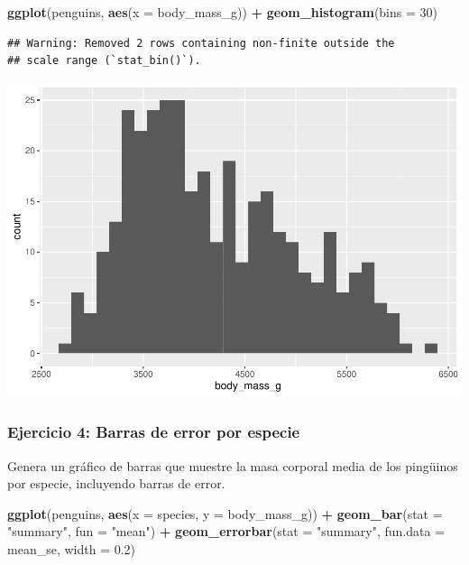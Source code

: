 \documentclass[
]{book}
\newenvironment{Shaded}{\begin{snugshade}}{\end{snugshade}}
\newcommand{\AttributeTok}[1]{\textcolor[rgb]{0.13,0.29,0.53}{#1}}
\newcommand{\DecValTok}[1]{\textcolor[rgb]{0.00,0.00,0.81}{#1}}
\newcommand{\FloatTok}[1]{\textcolor[rgb]{0.00,0.00,0.81}{#1}}
\newcommand{\FunctionTok}[1]{\textcolor[rgb]{0.13,0.29,0.53}{\textbf{#1}}}
\newcommand{\NormalTok}[1]{#1}
\newcommand{\SpecialCharTok}[1]{\textcolor[rgb]{0.81,0.36,0.00}{\textbf{#1}}}
\newcommand{\StringTok}[1]{\textcolor[rgb]{0.31,0.60,0.02}{#1}}
\begin{document}
\begin{Shaded}
\begin{Highlighting}[]
\FunctionTok{ggplot}\NormalTok{(penguins, }\FunctionTok{aes}\NormalTok{(}\AttributeTok{x =}\NormalTok{ body\_mass\_g)) }\SpecialCharTok{+}
  \FunctionTok{geom\_histogram}\NormalTok{(}\AttributeTok{bins =} \DecValTok{30}\NormalTok{)}
\end{Highlighting}
\end{Shaded}

\begin{verbatim}
## Warning: Removed 2 rows containing non-finite outside the
## scale range (`stat_bin()`).
\end{verbatim}

\includegraphics{bookdown-demo_files/figure-latex/unnamed-chunk-185-1.pdf}

\subsubsection{Ejercicio 4: Barras de error por especie}\label{ejercicio-4-barras-de-error-por-especie}

Genera un gráfico de barras que muestre la masa corporal media de los pingüinos por especie, incluyendo barras de error.

\begin{Shaded}
\begin{Highlighting}[]
\FunctionTok{ggplot}\NormalTok{(penguins, }\FunctionTok{aes}\NormalTok{(}\AttributeTok{x =}\NormalTok{ species, }\AttributeTok{y =}\NormalTok{ body\_mass\_g)) }\SpecialCharTok{+}
  \FunctionTok{geom\_bar}\NormalTok{(}\AttributeTok{stat =} \StringTok{"summary"}\NormalTok{, }\AttributeTok{fun =} \StringTok{"mean"}\NormalTok{) }\SpecialCharTok{+}
  \FunctionTok{geom\_errorbar}\NormalTok{(}\AttributeTok{stat =} \StringTok{"summary"}\NormalTok{, }\AttributeTok{fun.data =}\NormalTok{ mean\_se, }\AttributeTok{width =} \FloatTok{0.2}\NormalTok{)}
\end{Highlighting}
\end{Shaded}
\end{document}

